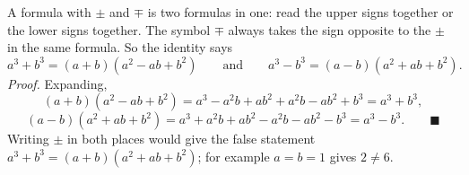 A formula with $\pm$ and $\mp$ is two formulas in one: read the upper signs together or the lower signs together. The symbol $\mp$ always takes the sign opposite to the $\pm$ in the same formula. So the identity says
\[
a^3+b^3=(a+b)\left(a^2-ab+b^2\right)\qquad\text{and}\qquad a^3-b^3=(a-b)\left(a^2+ab+b^2\right).
\]
\emph{Proof.} Expanding,
\[
(a+b)(a^2-ab+b^2)=a^3-a^2b+ab^2+a^2b-ab^2+b^3=a^3+b^3,
\]
\[
(a-b)(a^2+ab+b^2)=a^3+a^2b+ab^2-a^2b-ab^2-b^3=a^3-b^3 .\qquad\blacksquare
\]
Writing $\pm$ in both places would give the false statement $a^3+b^3=(a+b)(a^2+ab+b^2)$; for example $a=b=1$ gives $2\ne6$.
